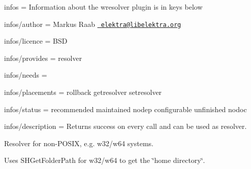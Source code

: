 
\begin{DoxyItemize}
\item infos = Information about the wresolver plugin is in keys below
\item infos/author = Markus Raab \href{mailto:elektra@libelektra.org}{\texttt{ elektra@libelektra.\+org}}
\item infos/licence = B\+SD
\item infos/provides = resolver
\item infos/needs =
\item infos/placements = rollback getresolver setresolver
\item infos/status = recommended maintained nodep configurable unfinished nodoc
\item infos/description = Returns success on every call and can be used as resolver.
\end{DoxyItemize}

Resolver for non-\/\+P\+O\+S\+IX, e.\+g. w32/w64 systems.

Uses S\+H\+Get\+Folder\+Path for w32/w64 to get the \char`\"{}home directory\char`\"{}. 